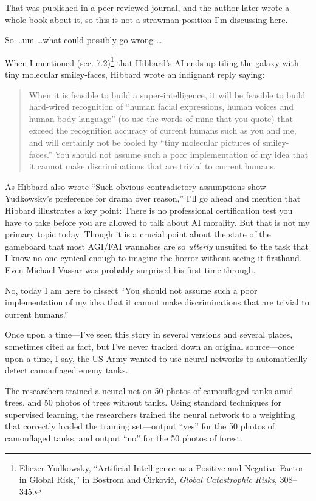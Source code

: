 {
 That was published in a peer-reviewed journal, and the author
later wrote a whole book about it, so this is not a strawman position
I'm discussing here.}

{
 So \ldots um \ldots what could possibly go wrong \ldots}

{
 When I mentioned (sec. 7.2)\footnote{Eliezer Yudkowsky, ``Artificial Intelligence
as a Positive and Negative Factor in Global Risk,''
in Bostrom and \'Cirkovi\'c, \textit{Global Catastrophic Risks},
308--345.} that
Hibbard's AI ends up tiling the galaxy with tiny
molecular smiley-faces, Hibbard wrote an indignant reply saying:}

\begin{quote}
{
 When it is feasible to build a super-intelligence, it will be
feasible to build hard-wired recognition of ``human
facial expressions, human voices and human body
language'' (to use the words of mine that you quote)
that exceed the recognition accuracy of current humans such as you and
me, and will certainly not be fooled by ``tiny
molecular pictures of smiley-faces.'' You should not
assume such a poor implementation of my idea that it cannot make
discriminations that are trivial to current humans.}
\end{quote}

{
 As Hibbard also wrote ``Such obvious
contradictory assumptions show Yudkowsky's preference
for drama over reason,'' I'll go
ahead and mention that Hibbard illustrates a key point: There is no
professional certification test you have to take before you are allowed
to talk about AI morality. But that is not my primary topic today.
Though it is a crucial point about the state of the gameboard that most
AGI/FAI wannabes are so \textit{utterly} unsuited to the task that I
know no one cynical enough to imagine the horror without seeing it
firsthand. Even Michael Vassar was probably surprised his first time
through.}

{
 No, today I am here to dissect ``You should not
assume such a poor implementation of my idea that it cannot make
discriminations that are trivial to current
humans.''}

{
 Once upon a time---I've seen this story in several
versions and several places, sometimes cited as fact, but
I've never tracked down an original source---once upon
a time, I say, the US Army wanted to use neural networks to
automatically detect camouflaged enemy tanks.}

{
 The researchers trained a neural net on 50 photos of camouflaged
tanks amid trees, and 50 photos of trees without tanks. Using standard
techniques for supervised learning, the researchers trained the neural
network to a weighting that correctly loaded the training set---output
``yes'' for the 50 photos of
camouflaged tanks, and output ``no''
for the 50 photos of forest.}

